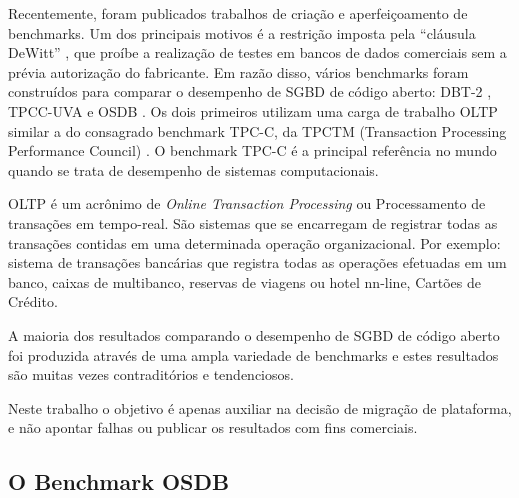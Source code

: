 Recentemente, foram publicados trabalhos de criação e aperfeiçoamento de benchmarks. Um dos principais motivos é a restrição imposta pela “cláusula DeWitt” \cite{moranb}, que proíbe a realização de testes em bancos de dados comerciais sem a prévia autorização do fabricante. Em razão disso, vários benchmarks foram construídos para comparar o desempenho de SGBD de código aberto: DBT-2
\cite{osdl}, TPCC-UVA \cite{hernandez02} e OSDB \cite{osdb}. Os dois primeiros utilizam uma carga de trabalho OLTP similar a do consagrado benchmark TPC-C, da TPCTM (Transaction Processing Performance Council) \cite{tpc}. O benchmark TPC-C é a principal referência no mundo quando se trata de desempenho de sistemas computacionais. 

OLTP é um acrônimo de \emph{Online Transaction Processing} ou Processamento de transações em tempo-real. São sistemas que se encarregam de registrar todas as transações contidas em uma determinada operação organizacional. Por exemplo: sistema de transações bancárias que registra todas as operações efetuadas em um banco, caixas de multibanco, reservas de viagens ou hotel nn-line, Cartões de Crédito.

A maioria dos resultados comparando o desempenho de SGBD de código aberto foi produzida através de uma ampla variedade de benchmarks e estes resultados são muitas vezes contraditórios e tendenciosos.

Neste trabalho o objetivo é apenas auxiliar na decisão de migração de plataforma, e não apontar falhas ou publicar os resultados com fins comerciais.

\subsection{O Benchmark OSDB}
\label{cha:osdb}


